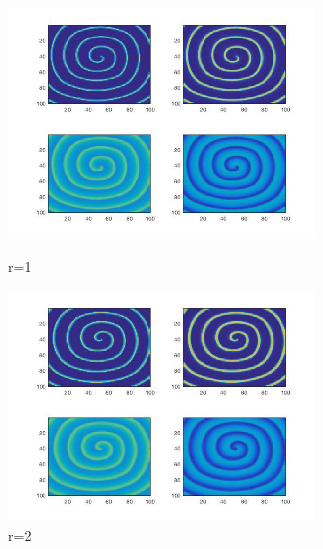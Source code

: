 \documentclass[
    bachelor,
    nofont, %
    pdflinks,
    ]{xjtuthesis}
\begin{document}
\begin{figure}
\begin{minipage}[!ht]{0.5\linewidth}
\centering
\includegraphics[width=3.2in]{p10r1_1.jpg}
\caption{r=1}
\end{minipage}%
\begin{minipage}[!ht]{0.5\linewidth}
\centering
\includegraphics[width=3.2in]{p10r2_1.jpg}
\caption{r=2}
\end{minipage}
\end{figure}
\end{document}

